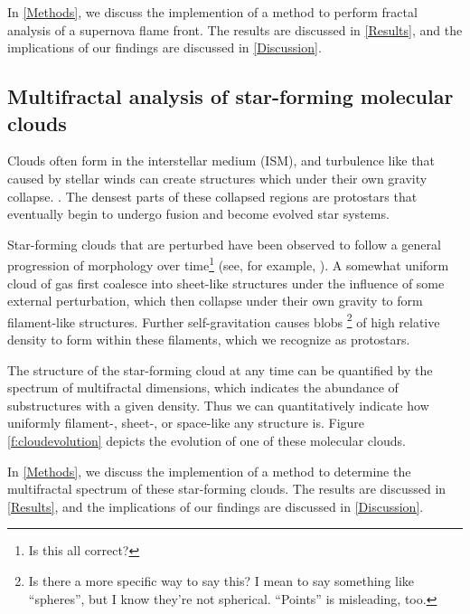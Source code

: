 \documentclass[iop]{emulateapj}
\begin{document}
In \textsection \ref{Methods}, we discuss the implemention of a method to perform fractal analysis of a supernova flame front. The results are discussed in \textsection \ref{Results}, and the implications of our findings are discussed in \textsection \ref{Discussion}.

\subsection{Multifractal analysis of star-forming molecular clouds}
Clouds often form in the interstellar medium (ISM), and turbulence like that caused by stellar winds can create structures which under their own gravity collapse. \citep{Bergin2007}. The densest parts of these collapsed regions are protostars that eventually begin to undergo fusion and become evolved star systems. 

Star-forming clouds that are perturbed have been observed to follow a general progression of morphology over time\footnote{Is this all correct?} (see, for example, \cite{Shu1987}). A somewhat uniform cloud of gas first coalesce into sheet-like structures under the influence of some external perturbation, which then collapse under their own gravity to form filament-like structures. Further self-gravitation causes blobs \footnote{Is there a more specific way to say this? I mean to say something like ``spheres'', but I know they're not spherical. ``Points'' is misleading, too.} of high relative density to form within these filaments, which we recognize as protostars.

The structure of the star-forming cloud at any time can be quantified by the spectrum of multifractal dimensions, which indicates the abundance of substructures with a given density. Thus we can quantitatively indicate how uniformly filament-, sheet-, or space-like any structure is. Figure \ref{f:cloudevolution} depicts the evolution of one of these molecular clouds.

In \textsection \ref{Methods}, we discuss the implemention of a method to determine the multifractal spectrum of these star-forming clouds. The results are discussed in \textsection \ref{Results}, and the implications of our findings are discussed in \textsection \ref{Discussion}.
\end{document}
